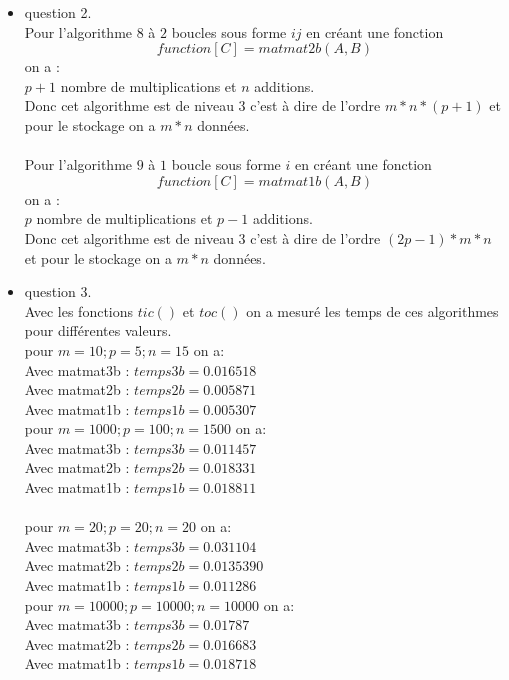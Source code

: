 \documentclass[]{article}
\begin{document}
\begin{itemize}
\begin{itemize}
\begin{itemize}
\item{question 2.\\}
Pour l'algorithme $8$ à $2$ boucles sous forme $ij$ en créant une fonction $$function [C] = matmat2b(A,B)$$ on a :\\
$p + 1$ nombre de multiplications et $n$ additions.\\
Donc cet algorithme est de niveau $3$ c'est à dire de l'ordre $m*n*(p + 1)$ et pour le stockage on a $m*n$ données.\\
\\
Pour l'algorithme $9$ à $1$ boucle sous forme $i$ en créant une fonction $$function [C] = matmat1b(A,B)$$ on a :\\
$p$ nombre de multiplications et $p - 1$ additions.\\
Donc cet algorithme est de niveau $3$ c'est à dire de l'ordre $(2p -1)*m*n$ et pour le stockage on a $m*n$ données.\\

\item{question 3.\\}
Avec les fonctions $tic()$ et $toc()$ on a mesuré les temps de ces algorithmes pour différentes valeurs.\\
pour $m=10 ; p=5 ;n=15$ on a:\\
Avec matmat3b : $temps3b= 0.016518$\\
Avec matmat2b : $temps2b= 0.005871$\\
Avec matmat1b : $temps1b= 0.005307$\\


pour $m=1000 ; p=100 ;n=1500$ on a:\\
Avec matmat3b : $temps3b= 0.011457$\\
Avec matmat2b : $temps2b= 0.018331$\\
Avec matmat1b : $temps1b= 0.018811$\\
\\
pour $m=20 ; p=20 ;n=20$ on a:\\
Avec matmat3b : $temps3b= 0.031104$\\
Avec matmat2b : $temps2b= 0.0135390$\\
Avec matmat1b : $temps1b= 0.011286$\\

pour $m=10000 ; p=10000 ;n=10000$ on a:\\
Avec matmat3b : $temps3b= 0.01787$\\
Avec matmat2b : $temps2b= 0.016683$\\
Avec matmat1b : $temps1b= 0.018718$\\


\end{itemize}
\end{itemize}
\end{itemize}
\end{document}
